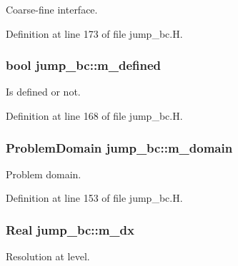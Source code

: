 Coarse-\/fine interface. 



Definition at line 173 of file jump\+\_\+bc.\+H.

\subsubsection[{\texorpdfstring{m\+\_\+defined}{m_defined}}]{\setlength{\rightskip}{0pt plus 5cm}bool jump\+\_\+bc\+::m\+\_\+defined\hspace{0.3cm}{\ttfamily [protected]}}\hypertarget{classjump__bc_a12902b215c91b1bf08dd45cd75aafc27}{}\label{classjump__bc_a12902b215c91b1bf08dd45cd75aafc27}


Is defined or not. 



Definition at line 168 of file jump\+\_\+bc.\+H.

\subsubsection[{\texorpdfstring{m\+\_\+domain}{m_domain}}]{\setlength{\rightskip}{0pt plus 5cm}Problem\+Domain jump\+\_\+bc\+::m\+\_\+domain\hspace{0.3cm}{\ttfamily [protected]}}\hypertarget{classjump__bc_a0cb7cfe80143e5eb5da685cef312b489}{}\label{classjump__bc_a0cb7cfe80143e5eb5da685cef312b489}


Problem domain. 



Definition at line 153 of file jump\+\_\+bc.\+H.

\subsubsection[{\texorpdfstring{m\+\_\+dx}{m_dx}}]{\setlength{\rightskip}{0pt plus 5cm}Real jump\+\_\+bc\+::m\+\_\+dx\hspace{0.3cm}{\ttfamily [protected]}}\hypertarget{classjump__bc_ac0388ba63f118459edf3a17281715900}{}\label{classjump__bc_ac0388ba63f118459edf3a17281715900}


Resolution at level. 



